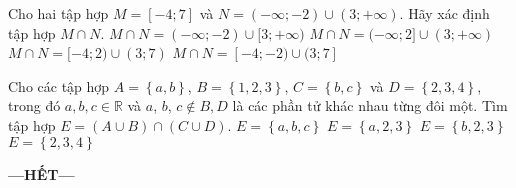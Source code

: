 \begin{ex}%
	Cho hai tập hợp $M=\left[-4;7\right]$ và $N=\left(-\infty;-2\right)\cup\left(3;+\infty\right)$. Hãy xác định tập hợp $M\cap N.$
	\choice
	{$M\cap N=(-\infty;-2) \cup [3;+\infty)$}
	{$M\cap N=(-\infty;2] \cup (3;+\infty)$}
	{$M\cap N=[-4;2)\cup (3;7)$}
	{\True$M\cap N=[-4;-2)\cup(3;7]$}
	\loigiai{
	}
\end{ex}

\begin{ex}%
\loigiai{
}
\end{ex}

\begin{ex}%
	Cho các tập hợp $A=\left\{a,b\right\}$, $B=\left\{1,2,3\right\}$, $C=\left\{b,c\right\}$ và $D=\left\{2,3,4\right\}$, trong đó $a, b, c\in\mathbb{R}$ và $a$, $b$, $c\notin B,D$ là các phần tử khác nhau từng đôi một. Tìm tập hợp $E=\left(A\cup B\right)\cap\left(C\cup D\right)$.
	\choice
	{$E=\left\{a,b,c\right\}$}
	{$E=\left\{a,2,3\right\}$}
	{\True $E=\left\{b,2,3\right\}$}
	{$E=\left\{2,3,4\right\}$}
\end{ex}
\centerline{\textbf{---HẾT---}}
